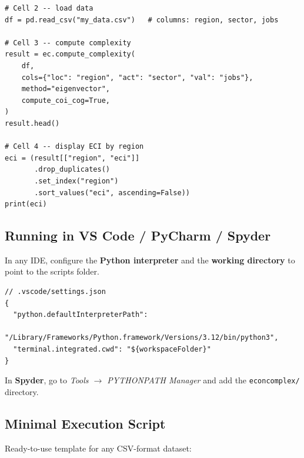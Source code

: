 \documentclass[12pt, a4paper]{article}
\begin{document}
\begin{lstlisting}[caption={Subsequent cells --- normal usage}]
# Cell 2 -- load data
df = pd.read_csv("my_data.csv")   # columns: region, sector, jobs

# Cell 3 -- compute complexity
result = ec.compute_complexity(
    df,
    cols={"loc": "region", "act": "sector", "val": "jobs"},
    method="eigenvector",
    compute_coi_cog=True,
)
result.head()

# Cell 4 -- display ECI by region
eci = (result[["region", "eci"]]
       .drop_duplicates()
       .set_index("region")
       .sort_values("eci", ascending=False))
print(eci)
\end{lstlisting}

\subsection{Running in VS Code / PyCharm / Spyder}

In any IDE, configure the \textbf{Python interpreter} and the
\textbf{working directory} to point to the scripts folder.

\begin{lstlisting}[style=bashstyle,
  caption={Configure path in VS Code (settings.json)}]
// .vscode/settings.json
{
  "python.defaultInterpreterPath":
      "/Library/Frameworks/Python.framework/Versions/3.12/bin/python3",
  "terminal.integrated.cwd": "${workspaceFolder}"
}
\end{lstlisting}

In \textbf{Spyder}, go to \textit{Tools $\to$ PYTHONPATH Manager}
and add the \texttt{econcomplex/} directory.

\subsection{Minimal Execution Script}

Ready-to-use template for any CSV-format dataset:
\end{document}
